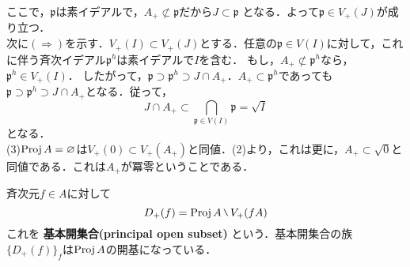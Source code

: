{  ここで，$\mathfrak{p}$は素イデアルで，$A_{+}\not \subset \mathfrak{p}$だから$J\subset \mathfrak{p}$
  となる．よって$\mathfrak{p} \in V_{+}(J)$が成り立つ．\\
  次に$(\Rightarrow)$を示す．$V_{+}(I)\subset V_{+}(J)$とする．任意の$\mathfrak{p} \in V(I)$に対して，これに伴う斉次イデアル$\mathfrak{p}^{h}$は素イデアルで$I$を含む．
  もし，$A_{+}\not \subset \mathfrak{p}^{h}$なら，$\mathfrak{p}^{h} \in V_{+}(I)$．
  したがって，$\mathfrak{p} \supset \mathfrak{p}^{h} \supset J\cap A_{+}$．$A_{+}\subset \mathfrak{p}^{h}$であっても$\mathfrak{p}\supset \mathfrak{p}^{h} \supset J\cap A_{+}$となる．従って，
  \begin{equation*}
    J\cap A_{+} \subset \bigcap_{\mathfrak{p} \in V(I)}\mathfrak{p} = \sqrt{I}
  \end{equation*}
  となる．\\
  (3)$\mathrm{Proj}\, A = \varnothing$は$V_{+}(0) \subset V_{+}(A_{+})$と同値．(2)より，これは更に，$A_{+}\subset \sqrt{0}$と同値である．これは$A_{+}$が冪零ということである．
}

斉次元$f\in A$に対して
\begin{equation*}
  D_{+}(f) = \proj{A}\mysetminus V_{+}(fA)
\end{equation*}
これを
\textbf{基本開集合(principal open subset)}
という．基本開集合の族$\{D_{+}(f)\}_{f}$は$\mathrm{Proj}\, A$の開基になっている．
\\







